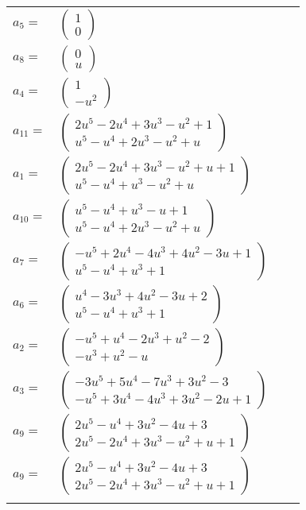 \documentclass[1p]{elsarticle_modified}
\theoremstyle{definition}
\begin{document}
\begin{tabular}{m{7pt} m{180pt} m{7pt} m{180pt} }
\flushright $a_{5}=$&$\begin{pmatrix}1\\0\end{pmatrix}$ \\
\flushright $a_{8}=$&$\begin{pmatrix}0\\u\end{pmatrix}$ \\
\flushright $a_{4}=$&$\begin{pmatrix}1\\- u^2\end{pmatrix}$ \\
\flushright $a_{11}=$&$\begin{pmatrix}2 u^5-2 u^4+3 u^3- u^2+1\\u^5- u^4+2 u^3- u^2+u\end{pmatrix}$ \\
\flushright $a_{1}=$&$\begin{pmatrix}2 u^5-2 u^4+3 u^3- u^2+u+1\\u^5- u^4+u^3- u^2+u\end{pmatrix}$ \\
\flushright $a_{10}=$&$\begin{pmatrix}u^5- u^4+u^3- u+1\\u^5- u^4+2 u^3- u^2+u\end{pmatrix}$ \\
\flushright $a_{7}=$&$\begin{pmatrix}- u^5+2 u^4-4 u^3+4 u^2-3 u+1\\u^5- u^4+u^3+1\end{pmatrix}$ \\
\flushright $a_{6}=$&$\begin{pmatrix}u^4-3 u^3+4 u^2-3 u+2\\u^5- u^4+u^3+1\end{pmatrix}$ \\
\flushright $a_{2}=$&$\begin{pmatrix}- u^5+u^4-2 u^3+u^2-2\\- u^3+u^2- u\end{pmatrix}$ \\
\flushright $a_{3}=$&$\begin{pmatrix}-3 u^5+5 u^4-7 u^3+3 u^2-3\\- u^5+3 u^4-4 u^3+3 u^2-2 u+1\end{pmatrix}$ \\
\flushright $a_{9}=$&$\begin{pmatrix}2 u^5- u^4+3 u^2-4 u+3\\2 u^5-2 u^4+3 u^3- u^2+u+1\end{pmatrix}$\\ \flushright $a_{9}=$&$\begin{pmatrix}2 u^5- u^4+3 u^2-4 u+3\\2 u^5-2 u^4+3 u^3- u^2+u+1\end{pmatrix}$\\&\end{tabular}
\end{document}

